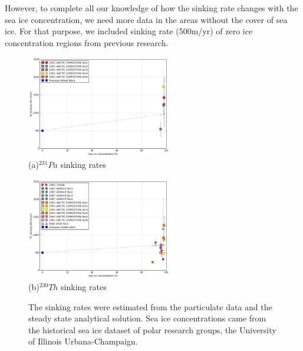 \documentclass[paper=a4, fontsize=11pt]{scrartcl} %
\numberwithin{equation}{section} %
\numberwithin{figure}{section} %
\numberwithin{table}{section} %
\begin{document}
However, to complete all our knowledge of how the sinking rate changes with the sea ice concentration,  we need more data in the areas without the cover of sea ice. For that purpose, we included sinking rate (500m/yr) of zero ice concentration regions from previous research. 

\begin{figure}[!h]
\centering
\begin{minipage}{.5\textwidth}
  \centering
  \includegraphics[width=15pc]{Figures/Pa_sinking.pdf}\\(a)$^{231}Pa$ sinking rates
\end{minipage}%
\begin{minipage}{.5\textwidth}
  \centering
  \includegraphics[width=15pc]{Figures/Th_sinking.pdf}\\(b)$^{230}Th$ sinking rates
  \end{minipage}
\caption{The sinking rates were estimated from the particulate data and the steady state analytical solution. Sea ice concentrations came from the historical sea ice dataset of polar research groups, the University of Illinois Urbana-Champaign.}
 \label{fig:sink}
\end{figure}
\end{document}
